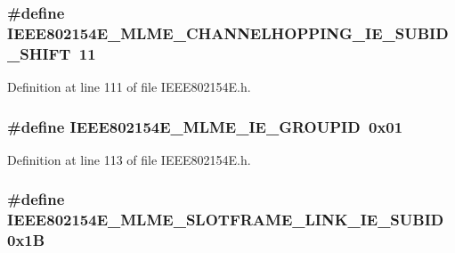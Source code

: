 \subsubsection[{\texorpdfstring{I\+E\+E\+E802154\+E\+\_\+\+M\+L\+M\+E\+\_\+\+C\+H\+A\+N\+N\+E\+L\+H\+O\+P\+P\+I\+N\+G\+\_\+\+I\+E\+\_\+\+S\+U\+B\+I\+D\+\_\+\+S\+H\+I\+FT}{IEEE802154E_MLME_CHANNELHOPPING_IE_SUBID_SHIFT}}]{\setlength{\rightskip}{0pt plus 5cm}\#define I\+E\+E\+E802154\+E\+\_\+\+M\+L\+M\+E\+\_\+\+C\+H\+A\+N\+N\+E\+L\+H\+O\+P\+P\+I\+N\+G\+\_\+\+I\+E\+\_\+\+S\+U\+B\+I\+D\+\_\+\+S\+H\+I\+FT~11}\hypertarget{group___i_e_e_e802154_e_ga602fe8b5e17e98fb3b4e66386699111b}{}\label{group___i_e_e_e802154_e_ga602fe8b5e17e98fb3b4e66386699111b}


Definition at line 111 of file I\+E\+E\+E802154\+E.\+h.

\subsubsection[{\texorpdfstring{I\+E\+E\+E802154\+E\+\_\+\+M\+L\+M\+E\+\_\+\+I\+E\+\_\+\+G\+R\+O\+U\+P\+ID}{IEEE802154E_MLME_IE_GROUPID}}]{\setlength{\rightskip}{0pt plus 5cm}\#define I\+E\+E\+E802154\+E\+\_\+\+M\+L\+M\+E\+\_\+\+I\+E\+\_\+\+G\+R\+O\+U\+P\+ID~0x01}\hypertarget{group___i_e_e_e802154_e_gab9ecb2dd95de50f96d70089656f1a4ac}{}\label{group___i_e_e_e802154_e_gab9ecb2dd95de50f96d70089656f1a4ac}


Definition at line 113 of file I\+E\+E\+E802154\+E.\+h.

\subsubsection[{\texorpdfstring{I\+E\+E\+E802154\+E\+\_\+\+M\+L\+M\+E\+\_\+\+S\+L\+O\+T\+F\+R\+A\+M\+E\+\_\+\+L\+I\+N\+K\+\_\+\+I\+E\+\_\+\+S\+U\+B\+ID}{IEEE802154E_MLME_SLOTFRAME_LINK_IE_SUBID}}]{\setlength{\rightskip}{0pt plus 5cm}\#define I\+E\+E\+E802154\+E\+\_\+\+M\+L\+M\+E\+\_\+\+S\+L\+O\+T\+F\+R\+A\+M\+E\+\_\+\+L\+I\+N\+K\+\_\+\+I\+E\+\_\+\+S\+U\+B\+ID~0x1B}\hypertarget{group___i_e_e_e802154_e_ga445f779d7a35a27880aa14af2036d75b}{}\label{group___i_e_e_e802154_e_ga445f779d7a35a27880aa14af2036d75b}


